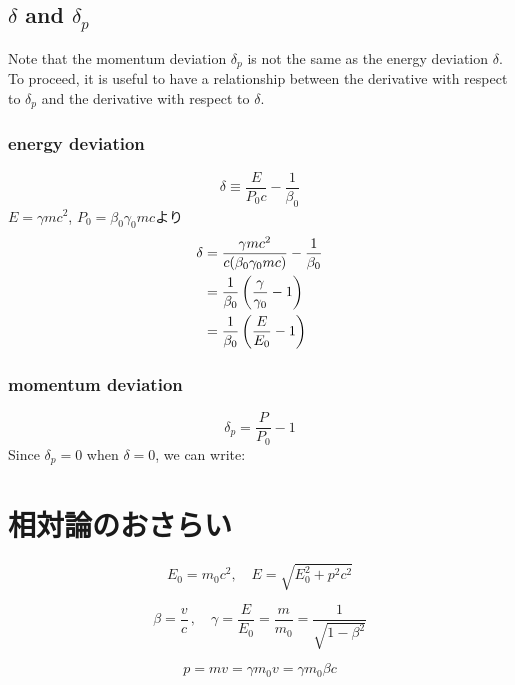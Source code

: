 \documentclass[10pt,a4paper]{ltjsarticle}
\begin{document}
%
\subsection{$\delta$ and $\delta_p$}
Note that the momentum deviation $\delta_p$ is not the same as the energy deviation $\delta$. To proceed, it is useful to have a relationship between the derivative with respect to $\delta_p$ and the derivative with respect to $\delta$.
%
\subsubsection{energy deviation}
%
\begin{equation}
    \delta \equiv \frac{E}{P_0 c} -\frac{1}{\beta_0}
\end{equation}
%
$E =\gamma m c^2$, $P_0 =\beta_0\gamma_0 mc$より
%
\begin{align}
    \delta &= \frac{\gamma m c^2}{c(\beta_0\gamma_0 m c)} - \frac{1}{\beta_0} \notag \\
    & = \frac{1}{\beta_0}\left(\frac{\gamma}{\gamma_0} - 1\right) \notag \\
    & = \frac{1}{\beta_0}\left(\frac{E}{E_0}-1\right)
\end{align}
%
\subsubsection{momentum deviation}
%
\begin{equation}
    \delta_p = \frac{P}{P_0} -1
\end{equation}
%
Since $\delta_p = 0$ when $\delta = 0$, we can write:

\clearpage

\appendix
\renewcommand{\theequation}{\Alph{section}.\arabic{equation} }
\setcounter{equation}{0}

\section{相対論のおさらい}
\begin{equation}
    E_0 = m_0 c^2 ,\quad E = \sqrt{E_0^2 + p^2 c^2}
\end{equation}

\begin{equation}
    \beta = \frac{v}{c}\,,\quad \gamma = \frac{E}{E_0}=\frac{m}{m_0}=\frac{1}{\sqrt{1-\beta^2}}
\end{equation}

\begin{equation}
    p = mv = \gamma m_0 v = \gamma m_0 \beta c
\end{equation}
\end{document}
